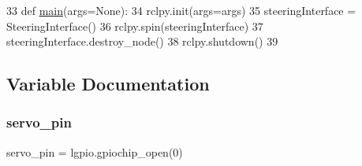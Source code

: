 \begin{DoxyCode}
33 \textcolor{keyword}{def }\mbox{\hyperlink{namespacetoxic__hardware_1_1servo__interface_a2278d6779516e4e6c64047946e8e9595}{main}}(args=None):
34     rclpy.init(args=args)
35     steeringInterface = SteeringInterface()
36     rclpy.spin(steeringInterface)
37     steeringInterface.destroy\_node()
38     rclpy.shutdown()
39 
\end{DoxyCode}


\subsection{Variable Documentation}
\mbox{\label{namespacetoxic__hardware_1_1servo__interface_ab818b24a3670d4f46c31af185e3cb93c}} 
\subsubsection{\texorpdfstring{servo\+\_\+pin}{servo\_pin}}
{\footnotesize\ttfamily servo\+\_\+pin = lgpio.\+gpiochip\+\_\+open(0)}


